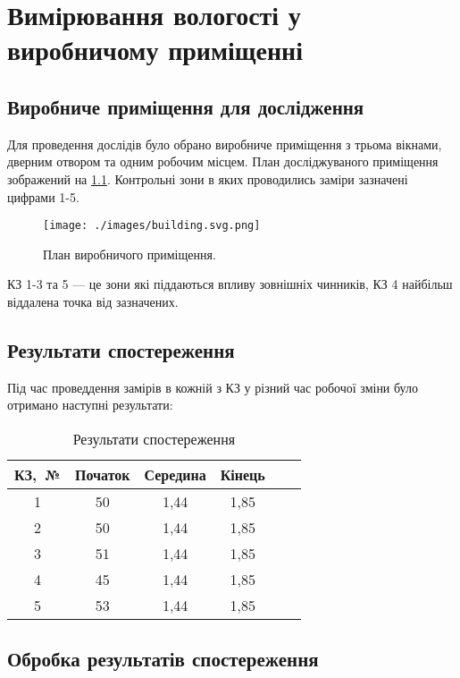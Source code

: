 \chapter{Вимірювання вологості у виробничому приміщенні}

\section{Виробниче приміщення для дослідження}

Для проведення дослідів було обрано виробниче приміщення з трьома вікнами, дверним отвором та одним
робочим місцем. План досліджуваного приміщення зображений на \ref{fig:building}. Контрольні зони в
яких проводились заміри зазначені цифрами 1-5.

\begin{figure}[h] \centering
  \texttt{[image: ./images/building.svg.png]}
  \caption{План виробничого приміщення.}
  \label{fig:building}
\end{figure}

КЗ 1-3 та 5 --- це зони які піддаються впливу зовнішніх чинників, КЗ 4 найбільш віддалена точка від
зазначених.

\section{Результати спостереження}

Під час проведдення замірів в кожній з КЗ у різний час робочої зміни було отримано наступні
результати:

\begin{table}[ht]
  \centering
  \caption{Результати спостереження}
\label{t:results}
\begin{tabular}{| c | c | c | c | c | c |}
\hline
\multicolumn{1}{|p{2cm}|}{КЗ,~№} &
\multicolumn{1}{C{2.2cm}|}{Початок} &
\multicolumn{1}{C{2.2cm}|}{Середина} &
\multicolumn{1}{C{2.2cm}|}{Кінець} \\ \hline 
1  & 50 & 1,44 & 1,85 \\ \hline 
2 & 50 & 1,44 & 1,85 \\ \hline 
3 & 51 & 1,44 & 1,85 \\ \hline 
4  & 45 & 1,44 & 1,85 \\ \hline 
5 & 53 & 1,44 & 1,85 \\ \hline 
\end{tabular}
\end{table}

\section{Обробка результатів спостереження}

